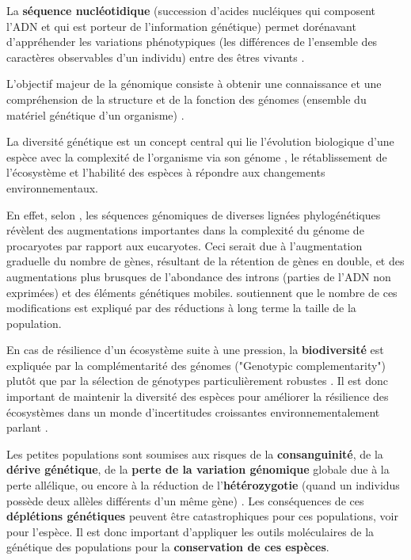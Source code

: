 \documentclass[a4paper]{article}
\begin{document}
La \textbf{séquence nucléotidique} (succession d'acides nucléiques qui composent l'ADN et qui est porteur de l'information génétique) permet dorénavant d'appréhender les variations phénotypiques (les différences de l'ensemble des caractères observables d'un individu) entre des êtres vivants \cite{champe1962reversal}.

L'objectif majeur de la génomique consiste à obtenir une connaissance et une compréhension de la structure et de la fonction des génomes (ensemble du matériel génétique d'un organisme) \cite{eggen2003approches}.

La diversité génétique est un concept central qui lie l'évolution biologique d'une espèce avec la complexité de l'organisme via son génome \cite{lynch2003origins}, le rétablissement de l'écosystème \cite{reusch2005ecosystem} et l'habilité des espèces à répondre aux changements environnementaux\cite{o1994role}.

En effet, selon \cite{lynch2003origins}, les séquences génomiques de diverses lignées phylogénétiques révèlent des augmentations importantes dans la complexité du génome de procaryotes par rapport aux eucaryotes. Ceci serait due à l'augmentation graduelle du nombre de gènes, résultant de la rétention de gènes en double, et des augmentations plus brusques de l'abondance des introns (parties de l'ADN non exprimées) et des éléments génétiques mobiles. \cite{lynch2003origins} soutiennent que le nombre de ces modifications est expliqué par des réductions à long terme la taille de la population.

En cas de résilience d'un écosystème suite à une pression, la \textbf{biodiversité} est expliquée par la complémentarité des génomes ("Genotypic complementarity") plutôt que par la sélection de génotypes particulièrement robustes \cite{reusch2005ecosystem}. Il est donc important de maintenir la diversité des espèces pour améliorer la résilience des écosystèmes dans un monde d'incertitudes croissantes environnementalement parlant \cite{reusch2005ecosystem}.

Les petites populations sont soumises aux risques de la \textbf{consanguinité}, de la \textbf{dérive génétique}, de la \textbf{perte de la variation génomique} globale due à la perte allélique, ou encore à la réduction de l'\textbf{hétérozygotie} (quand un individus possède deux allèles différents d'un même gène) \cite{o1994role}. Les conséquences de ces \textbf{déplétions génétiques} \cite{o1994role} peuvent être catastrophiques pour ces populations, voir pour l'espèce. Il est donc important d'appliquer les outils moléculaires de la génétique des populations pour la \textbf{conservation de ces espèces}.
\end{document}
